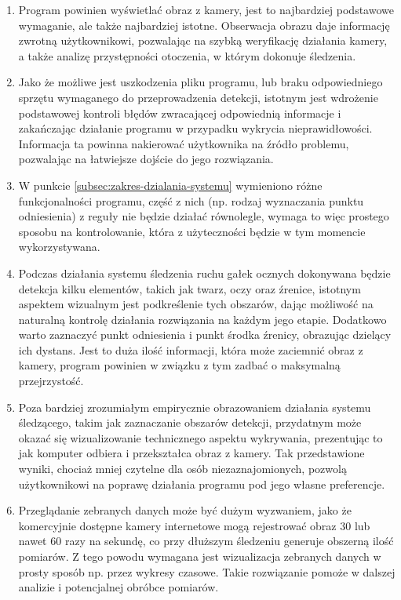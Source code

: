 \documentclass[a4paper,twoside,12pt]{book}
\begin{document}
\begin{enumerate}
	\item Program powinien wyświetlać obraz z kamery, jest to najbardziej podstawowe wymaganie, ale także najbardziej istotne. Obserwacja obrazu daje informację zwrotną użytkownikowi, pozwalając na szybką weryfikację działania kamery, a także analizę przystępności otoczenia, w którym dokonuje śledzenia.
	\item Jako że możliwe jest uszkodzenia pliku programu, lub braku odpowiedniego sprzętu wymaganego do przeprowadzenia detekcji, istotnym jest wdrożenie podstawowej kontroli błędów zwracającej odpowiednią informacje i zakańczając działanie programu w przypadku wykrycia nieprawidłowości. Informacja ta powinna nakierować użytkownika na źródło problemu, pozwalając na łatwiejsze dojście do jego rozwiązania.
	\item W punkcie \ref{subsec:zakres-dzialania-systemu} wymieniono różne funkcjonalności programu, część z nich (np. rodzaj wyznaczania punktu odniesienia) z reguły nie będzie działać równolegle, wymaga to więc prostego sposobu na kontrolowanie, która z użyteczności będzie w tym momencie wykorzystywana. 
	\item Podczas działania systemu śledzenia ruchu gałek ocznych dokonywana będzie detekcja kilku elementów, takich jak twarz, oczy oraz źrenice, istotnym aspektem wizualnym jest podkreślenie tych obszarów, dając możliwość na naturalną kontrolę działania rozwiązania na każdym jego etapie. Dodatkowo warto zaznaczyć punkt odniesienia i punkt środka źrenicy, obrazując dzielący ich dystans. Jest to duża ilość informacji, która może zaciemnić obraz z kamery, program powinien w związku z tym zadbać o maksymalną przejrzystość.
	\item Poza bardziej zrozumiałym empirycznie obrazowaniem działania systemu śledzącego, takim jak zaznaczanie obszarów detekcji, przydatnym może okazać się wizualizowanie technicznego aspektu wykrywania, prezentując to jak komputer odbiera i przekształca obraz z kamery. Tak przedstawione wyniki, chociaż mniej czytelne dla osób niezaznajomionych, pozwolą użytkownikowi na poprawę działania programu pod jego własne preferencje.
	\item Przeglądanie zebranych danych może być dużym wyzwaniem, jako że komercyjnie dostępne kamery internetowe mogą rejestrować obraz $30$ lub nawet $60$ razy na sekundę, co przy dłuższym śledzeniu generuje obszerną ilość pomiarów. Z tego powodu wymagana jest wizualizacja zebranych danych w prosty sposób np. przez wykresy czasowe. Takie rozwiązanie pomoże w dalszej analizie i potencjalnej obróbce pomiarów.
\end{enumerate}
\end{document}
